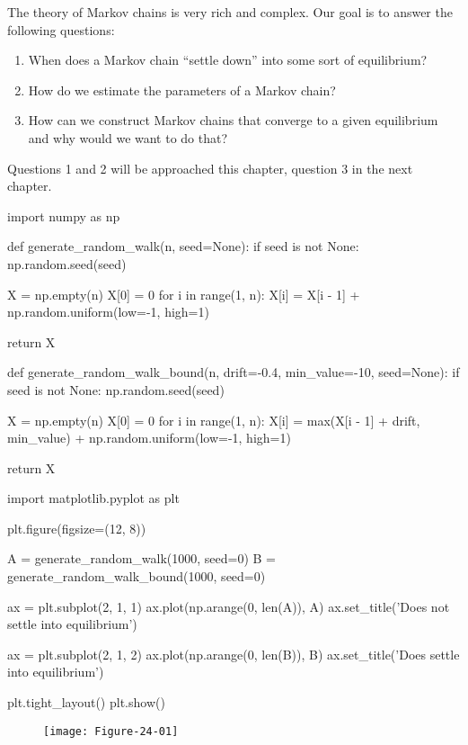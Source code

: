 The theory of Markov chains is very rich and complex. Our goal is to
answer the following questions:

\begin{enumerate}
\def\labelenumi{\arabic{enumi}.}
\item
  When does a Markov chain ``settle down'' into some sort of
  equilibrium?
\item
  How do we estimate the parameters of a Markov chain?
\item
  How can we construct Markov chains that converge to a given
  equilibrium and why would we want to do that?
\end{enumerate}

Questions 1 and 2 will be approached this chapter, question 3 in the
next chapter.

\begin{python}
import numpy as np

def generate_random_walk(n, seed=None):
    if seed is not None:
        np.random.seed(seed)
    
    X = np.empty(n)
    X[0] = 0
    for i in range(1, n):
        X[i] = X[i - 1] + np.random.uniform(low=-1, high=1)
    
    return X

def generate_random_walk_bound(n, drift=-0.4, min_value=-10, seed=None):
    if seed is not None:
        np.random.seed(seed)
    
    X = np.empty(n)
    X[0] = 0
    for i in range(1, n):
        X[i] = max(X[i - 1] + drift, min_value) + np.random.uniform(low=-1, high=1)
    
    return X
\end{python}

\begin{python}
import matplotlib.pyplot as plt

plt.figure(figsize=(12, 8))

A = generate_random_walk(1000, seed=0)
B = generate_random_walk_bound(1000, seed=0)

ax = plt.subplot(2, 1, 1)
ax.plot(np.arange(0, len(A)), A)
ax.set_title('Does not settle into equilibrium')

ax = plt.subplot(2, 1, 2)
ax.plot(np.arange(0, len(B)), B)
ax.set_title('Does settle into equilibrium')

plt.tight_layout()
plt.show()
\end{python}

\begin{figure}[H]
\centering
\texttt{[image: Figure-24-01]}
\end{figure}


